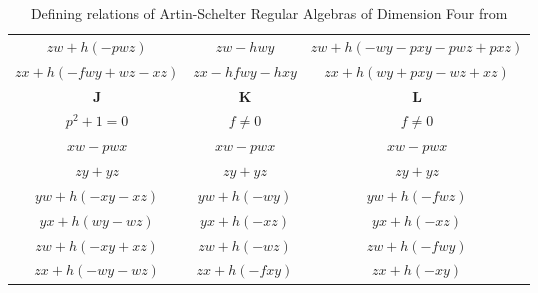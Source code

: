 \documentclass{amsart}
\begin{document}
\begin{table}[H]
{{\begin{tabular}{|c|c|c|}
 $zw + h(-pwz)$ & $zw - hwy$ & $zw +h(- wy - p xy - p wz + p xz)$ \\
 $zx + h(-fwy + wz - xz)$ & $zx - hfwy - hxy$ & $zx +h( wy + p xy - wz + xz)$ \\\hline \hline
 \textbf{J} & \textbf{K} & \textbf{L} \\ \hline \hline
$p^2 + 1 = 0$ & $f \neq 0$ & $f \neq 0$ \\ \hline
$xw - p wx$ & $xw - p wx$ & $xw - p wx$ \\ 
$zy + yz$ & $zy + yz$ & $zy + yz$ \\ 
 $yw+h( - xy - xz)$ & $yw +h(- wy)$ & $yw +h(- f wz)$ \\ 
 $yx + h(wy - wz)$ & $yx +h(- xz)$ & $yx +h(- xz)$ \\ 
 $zw +h(- xy + xz)$ & $zw +h(- wz)$ & $zw +h(- f wy)$ \\ 
 $zx +h(- wy - wz)$ & $zx +h(- f xy)$ & $zx +h(- xy)$ \\ \hline
\end{tabular}
}}
\caption{Defining relations of Artin-Schelter Regular Algebras of Dimension Four from \cite{MR2529094}}
\end{table}
\end{document}
